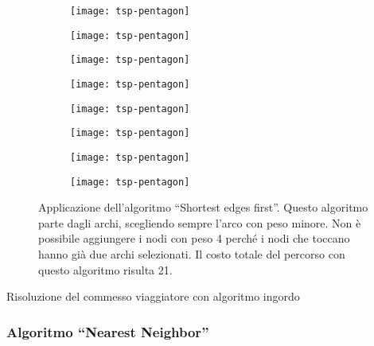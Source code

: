 \begin{figure}[H]\centering
	\begin{subfigure}{.25\linewidth}\centering
		\texttt{[image: tsp-pentagon]}
	\end{subfigure}%
	\begin{subfigure}{.25\linewidth}\centering
		\texttt{[image: tsp-pentagon]}
	\end{subfigure}%
	\begin{subfigure}{.25\linewidth}\centering
		\texttt{[image: tsp-pentagon]}
	\end{subfigure}%
	\begin{subfigure}{.25\linewidth}\centering
		\texttt{[image: tsp-pentagon]}
	\end{subfigure}

	\vspace{10pt}

	\begin{subfigure}{.25\linewidth}\centering
		\texttt{[image: tsp-pentagon]}
	\end{subfigure}%
	\begin{subfigure}{.25\linewidth}\centering
		\texttt{[image: tsp-pentagon]}
	\end{subfigure}%
	\begin{subfigure}{.25\linewidth}\centering
		\texttt{[image: tsp-pentagon]}
	\end{subfigure}%
	\begin{subfigure}{.25\linewidth}\centering
		\texttt{[image: tsp-pentagon]}
	\end{subfigure}%

	\caption[Applicazione dell'algoritmo ingordo \enquote{Shortest edges first} per {\tsp}]{Applicazione dell'algoritmo \enquote{Shortest edges first}. Questo algoritmo parte dagli archi, scegliendo sempre l'arco con peso minore. Non è possibile aggiungere i nodi con peso 4 perché i nodi che toccano hanno già due archi selezionati. Il costo totale del percorso con questo algoritmo risulta 21.}
\end{figure}

\begin{algorithm}[H]
	\caption{Risoluzione del commesso viaggiatore con algoritmo ingordo}
	
\end{algorithm}

\newpage
\subsubsection{Algoritmo \enquote{Nearest Neighbor}}

